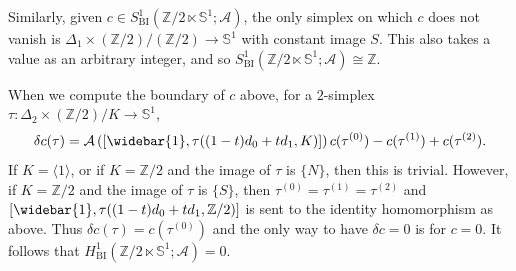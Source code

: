 \documentclass[12pt,reqno]{amsart}
\newcommand{\calA}{{\mathcal{A}}}
\renewcommand{\SS}{{\mathbb{S}}} %
\newcommand{\ZZ}{{\mathbb{Z}}}  %
\theoremstyle{plain}
\theoremstyle{definition}
\newenvironment{example}
		{\pushQED{\qed}\renewcommand{\qedsymbol}{$/\!\!/$}\examplex}
		{\popQED\endexamplex}
\newcommand{\BI}{{\operatorname{BI}}} %
\begin{document}
\begin{example}[{\bf Groupoid A}]
        Similarly, given $c\in S^1_\BI(\ZZ/2\ltimes\SS^1;\calA)$, the only simplex on which $c$ does not vanish is $\Delta_1\times(\ZZ/2)/(\ZZ/2)\to\SS^1$ with constant image $S$.  This also takes a value as an arbitrary integer, and so $S_\BI^1(\ZZ/2\ltimes\SS^1;\calA)\cong\ZZ$.

        When we compute the boundary of $c$ above, for a $2$-simplex $\tau\colon\Delta_2\times(\ZZ/2)/K\to\SS^1$,
        $$\delta c(\tau)=\calA\left([\widebar{1},\tau((1-t)d_0+td_1,K)]\right)c(\tau^{(0)})-c(\tau^{(1)})+c(\tau^{(2)}).$$
        If $K=\langle1\rangle$, or if $K=\ZZ/2$ and the image of $\tau$ is $\{N\}$, then this is trivial.  However, if $K=\ZZ/2$ and the image of $\tau$ is $\{S\}$, then $\tau^{(0)}=\tau^{(1)}=\tau^{(2)}$ and $[\widebar{1},\tau((1-t)d_0+td_1,\ZZ/2)]$ is sent to the identity homomorphism as above.  Thus  $\delta c(\tau)=c(\tau^{(0)})$ and the only way to have $\delta c =0$ is for $c = 0$.   It follows that $H^1_\BI(\ZZ/2\ltimes\SS^1;\calA)=0$.
    \end{example}
 
\end{document}
